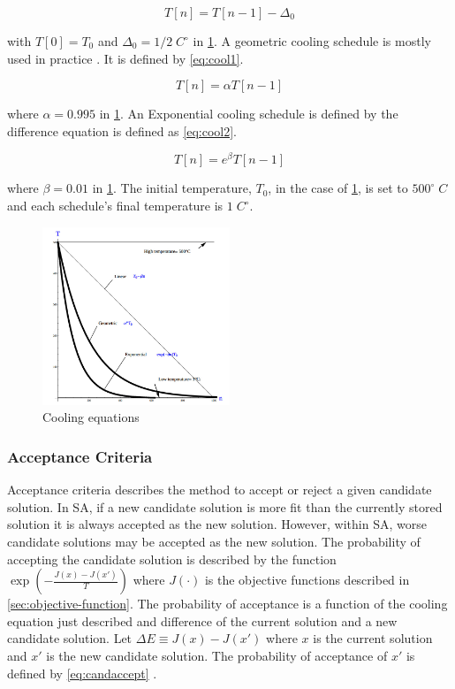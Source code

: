 \documentclass[ee,msthesis]{usuthesis}
\newcommand{\Tau}{T}                        %
\begin{document}
\begin{equation}
\label{eq:cool0}
\Tau[n] = \Tau[n-1] - \Delta_0
\end{equation}

with \(\Tau[0] = \Tau_0\) and \(\Delta_0 = 1/2\; C^\circ\) in \ref{fig:cool}. A geometric cooling schedule is mostly used in practice
\cite{keller-2019-multi-objec}. It is defined by \ref{eq:cool1}.

\begin{equation}
\label{eq:cool1}
\Tau[n] = \alpha \Tau[n-1]
\end{equation}

where \(\alpha = 0.995\) in \ref{fig:cool}. An Exponential cooling schedule is defined by the difference equation is defined as
\ref{eq:cool2}.

\begin{equation}
\label{eq:cool2}
\Tau[n] = e^{\beta}\Tau[n-1]
\end{equation}

where \(\beta = 0.01\) in \ref{fig:cool}. The initial temperature, \(T_0\), in the case of \ref{fig:cool}, is set to \(500^\circ\; C\) and
each schedule's final temperature is \(1\; C^\circ\).

\begin{figure}[htbp]
\centering
\includegraphics[width=0.5\textwidth]{img/cool-func.jpg}
\caption{\label{fig:cool}Cooling equations}
\end{figure}

\subsubsection{Acceptance Criteria}
\label{sec:acceptance}
Acceptance criteria describes the method to accept or reject a given candidate solution. In SA, if a new candidate
solution is more fit than the currently stored solution it is always accepted as the new solution. However, within SA,
worse candidate solutions may be accepted as the new solution. The probability of accepting the candidate solution is
described by the function \(\exp(-\frac{J(x) - J(x')}{\Tau})\) where \(J(\cdot)\) is the objective functions described in
\ref{sec:objective-function}. The probability of acceptance is a function of the cooling equation just described and
difference of the current solution and a new candidate solution. Let \(\Delta E \equiv J(x) - J(x')\) where \(x\) is the current
solution and \(x'\) is the new candidate solution. The probability of acceptance of \(x'\) is defined by \ref{eq:candaccept}
\cite{keller-2019-multi-objec}.
\end{document}
